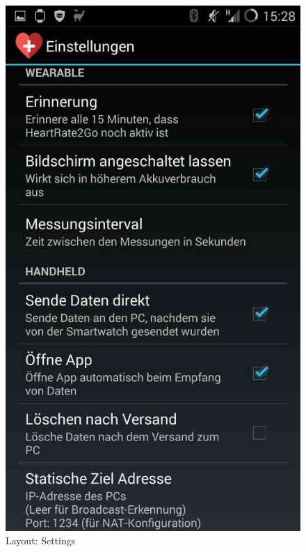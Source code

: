 \begin{minipage}[c]{0.5\textwidth}
	\begin{figure}[H]
		\centering
		\includegraphics[scale=0.3]{images/layout_settings.jpg}
		\caption{Layout: Settings}
		\label{fig:layout_settings}
	\end{figure}
\end{minipage}
\\[0.7cm]

